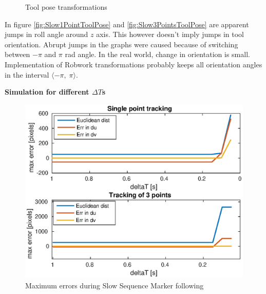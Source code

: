 \documentclass[]{scrartcl}
\begin{document}
\begin{figure}[!h]
	\hfill
	\caption{Tool pose transformations}
	\label{fig:SlowSequenceToolPose}
\end{figure}
In figure \ref{fig:Slow1PointToolPose} and \ref{fig:Slow3PointsToolPose} are apparent jumps in roll angle around $z$ axis. This however doesn't imply jumps in tool orientation. Abrupt jumps in the graphs were caused because of switching between $-\pi$ and $\pi$ rad angle. In the real world, change in orientation is small. Implementation of Robwork transformations probably keeps all orientation angles in the interval $ \langle -\pi, \; \pi \rangle $.

\vspace{0.5cm}
\textbf{Simulation for different $\Delta T$s} \\
\begin{figure}
	\centering
	\includegraphics[width=0.7\linewidth]{fig/SlowSequence_errors.eps}
	\caption{Maximum errors during Slow Sequence Marker following}
	\label{fig:SlowSequence_errors}
\end{figure}
\end{document}
